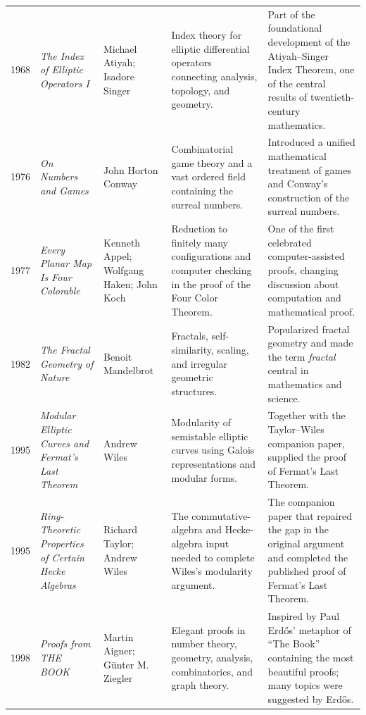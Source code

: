 {\begin{longtable}{@{}L{0.08\textwidth}L{0.21\textwidth}L{0.15\textwidth}L{0.22\textwidth}L{0.26\textwidth}@{}}
        1968
        & \textit{The Index of Elliptic Operators I}
        & Michael Atiyah; Isadore Singer
        & Index theory for elliptic differential operators connecting analysis, topology, and geometry.
        & Part of the foundational development of the Atiyah--Singer Index Theorem, one of the central results of twentieth-century mathematics. \\

        1976
        & \textit{On Numbers and Games}
        & John Horton Conway
        & Combinatorial game theory and a vast ordered field containing the surreal numbers.
        & Introduced a unified mathematical treatment of games and Conway's construction of the surreal numbers. \\

        1977
        & \textit{Every Planar Map Is Four Colorable}
        & Kenneth Appel; Wolfgang Haken; John Koch
        & Reduction to finitely many configurations and computer checking in the proof of the Four Color Theorem.
        & One of the first celebrated computer-assisted proofs, changing discussion about computation and mathematical proof. \\

        1982
        & \textit{The Fractal Geometry of Nature}
        & Benoit Mandelbrot
        & Fractals, self-similarity, scaling, and irregular geometric structures.
        & Popularized fractal geometry and made the term \emph{fractal} central in mathematics and science. \\

        1995
        & \textit{Modular Elliptic Curves and Fermat's Last Theorem}
        & Andrew Wiles
        & Modularity of semistable elliptic curves using Galois representations and modular forms.
        & Together with the Taylor--Wiles companion paper, supplied the proof of Fermat's Last Theorem. \\

        1995
        & \textit{Ring-Theoretic Properties of Certain Hecke Algebras}
        & Richard Taylor; Andrew Wiles
        & The commutative-algebra and Hecke-algebra input needed to complete Wiles's modularity argument.
        & The companion paper that repaired the gap in the original argument and completed the published proof of Fermat's Last Theorem. \\

        1998
        & \textit{Proofs from THE BOOK}
        & Martin Aigner; G\"unter M. Ziegler
        & Elegant proofs in number theory, geometry, analysis, combinatorics, and graph theory.
        & Inspired by Paul Erd\H{o}s' metaphor of ``The Book'' containing the most beautiful proofs; many topics were suggested by Erd\H{o}s. \\


\end{longtable}}
